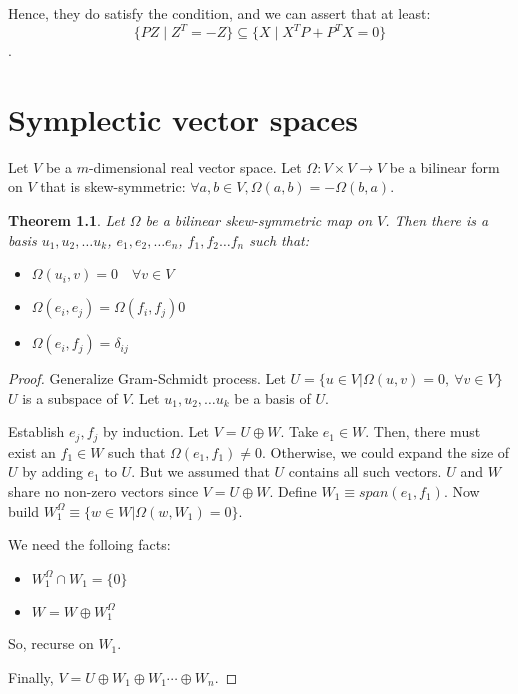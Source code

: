 \documentclass[11pt]{book}
\newtheorem{theorem}{Theorem}
\newtheorem{proof}{Proof}
\begin{document}
Hence, they do satisfy the condition, and we can assert that at least:
$$\{ PZ \mid Z^T = -Z \} \subseteq  \{ X \mid X^T P + P^T X = 0 \}$$.

\chapter{Symplectic vector spaces}


Let $V$ be a $m$-dimensional real vector space. Let $\Omega: V \times V \rightarrow V$
be a bilinear form on $V$ that is skew-symmetric:
$\forall a, b \in V, \Omega(a, b) = -\Omega(b, a)$.

\begin{theorem}
    Let $\Omega$ be a bilinear skew-symmetric map on $V$. Then there is a basis
    $u_1, u_2, \dots u_k$, $e_1, e_2, \dots e_n$, $f_1, f_2 \dots f_n$ such that:
    \begin{itemize}
        \item $\Omega(u_i, v) = 0 \quad \forall v \in V$
        \item $\Omega(e_i, e_j) =  \Omega(f_i, f_j) 0$
        \item $\Omega(e_i, f_j) = \delta_{ij}$
    \end{itemize}
\end{theorem}
\begin{proof}
    Generalize Gram-Schmidt process.
    Let $U = \{ u \in V | \Omega(u, v) = 0, ~\forall v \in V \}$
    $U$ is a subspace of $V$. Let $u_1, u_2, \dots u_k$ be a basis of $U$.

    Establish $e_j, f_j$ by induction. Let $V = U \oplus W$. Take $e_1 \in W$.
    Then, there must exist an $f_1 \in W$ such that $\Omega(e_1, f_1) \neq 0$. 
    Otherwise, we could expand the size of $U$ by adding $e_1$ to $U$. But
    we assumed that $U$ contains all such vectors. $U$ and $W$ share no non-zero
    vectors since $V = U \oplus W$.  Define $W_1 \equiv span(e_1, f_1)$.  
    Now build $W_1^\Omega \equiv \{ w \in W | \Omega(w, W_1) = 0 \}$.

    We need the folloing facts:
    \begin{itemize}
        \item $W_1^\Omega \cap W_1 = \{ 0 \}$
        \item $W = W \oplus W_1^\Omega$
    \end{itemize}

    So, recurse on $W_1$.

    Finally, $V = U \oplus W_1 \oplus W_1 \cdots \oplus W_n$.
\end{proof}
\end{document}
